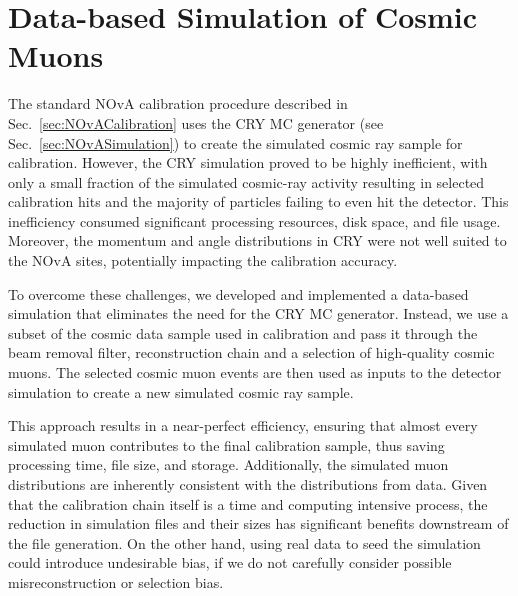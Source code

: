 
\section{Data-based Simulation of Cosmic Muons}\label{sec:DataBasedSimulation}
The standard \gls{NOvA} calibration procedure described in Sec.~\ref{sec:NOvACalibration} uses the \gls{CRY} \gls{MC} generator (see Sec.~\ref{sec:NOvASimulation}) to create the simulated cosmic ray sample for calibration. However, the \gls{CRY} simulation proved to be highly inefficient, with only a small fraction of the simulated cosmic-ray activity resulting in selected calibration hits and the majority of particles failing to even hit the detector. This inefficiency consumed significant processing resources, disk space, and file usage. Moreover, the momentum and angle distributions in \gls{CRY} were not well suited to the \gls{NOvA} sites, potentially impacting the calibration accuracy.

To overcome these challenges, we developed and implemented a data-based simulation that eliminates the need for the \gls{CRY} \gls{MC} generator. Instead, we use a subset of the cosmic data sample used in calibration and pass it through the beam removal filter, reconstruction chain and a selection of high-quality cosmic muons. The selected cosmic muon events are then used as inputs to the detector simulation to create a new simulated cosmic ray sample.

This approach results in a near-perfect efficiency, ensuring that almost every simulated muon contributes to the final calibration sample, thus saving processing time, file size, and storage. Additionally, the simulated muon distributions are inherently consistent with the distributions from data. Given that the calibration chain itself is a time and computing intensive process, the reduction in simulation files and their sizes has significant benefits downstream of the file generation. On the other hand, using real data to seed the simulation could introduce undesirable bias, if we do not carefully consider possible misreconstruction or selection bias.

